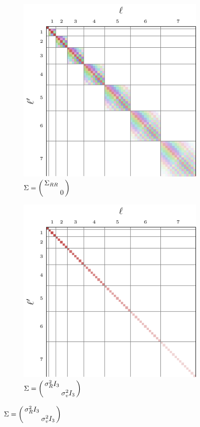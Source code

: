 \documentclass[../../main.tex]{subfiles}
\begin{document}
\begin{refsection}
\begin{figure}
		\bigskip
		\begin{subfigure}[b]{0.31\textwidth}
			\centering
			\caption{$\Sigma = \smqty(\dmat{\Sigma_{RR}, 0})$}
			\includegraphics[width=\textwidth]{ftrans_se3_rot.pdf}
		\end{subfigure}
		\begin{subfigure}[b]{0.31\textwidth}
			\centering
			\caption{$\Sigma = \smqty(\dmat{\sigma_R^2 I_3, \sigma_v^2 I_3})$}
			\includegraphics[width=\textwidth]{ftrans_se3_scalarindep.pdf}

\end{subfigure}
\end{figure}
\end{refsection}
\end{document}
